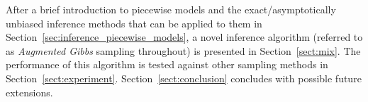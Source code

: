 



After a brief introduction to piecewise models and the
exact/asymptotically unbiased inference methods that can be applied to 
them in Section~\ref{sec:inference_piecewise_models}, a novel inference 
algorithm (referred to as \emph{Augmented Gibbs} sampling throughout)
is presented in Section~\ref{sect:mix}.  The performance of this
algorithm is tested against other sampling methods in
Section~\ref{sect:experiment}.
Section~\ref{sect:conclusion} concludes with possible future extensions.
